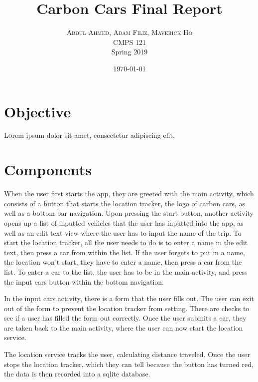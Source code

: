 \documentclass[twoside,twocolumn]{article}
\title{Carbon Cars Final Report} %
\author{%
\textsc{Abdul Ahmed, Adam Filiz, Maverick Ho}\\[1ex] %
\normalsize CMPS 121 \\ %
\normalsize  Spring 2019
}
\date{\today} %
\begin{document}
\maketitle


\section{Objective}

\lettrine[nindent=0em,lines=3]{L} orem ipsum dolor sit amet, consectetur adipiscing elit.
\blindtext %

\blindtext %


\section{Components}

When the user first starts the app, they are greeted with the main activity, which consists of a button that starts the location tracker, the logo of carbon cars, as well as a bottom bar navigation. Upon pressing the start button, another activity opens up a list of inputted vehicles that the user has inputted into the app, as well as an edit text view where the user has to input the name of the trip. To start the location tracker, all the user needs to do is to enter a name in the edit text, then press a car from within the list. If the user forgets to put in a name, the location won't start, they have to enter a name, then press a car from the list. To enter a car to the list, the user has to be in the main activity, and press the input cars button within the bottom navigation.

In the input cars activity, there is a form that the user fills out. The user can exit out of the form to prevent the location tracker from setting. There are checks to see if a user has filled the form out correctly. Once the user submits a car, they are taken back to the main activity, where the user can now start the location service.

The location service tracks the user, calculating distance traveled. Once the user stops the location tracker, which they can tell because the button has turned red, the data is then recorded into a sqlite database. 
\end{document}
